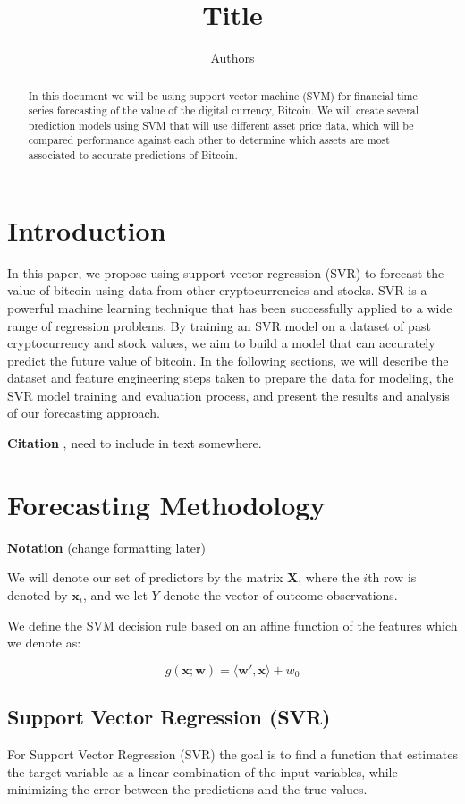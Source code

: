 \documentclass[11pt]{article}
\title{\vspace{-2cm}Title}
\author{Authors}
\date{\vspace{-5ex}}
\theoremstyle{definition}
\newcommand{\bx}{\mathbf{x}}
\newcommand{\bw}{\mathbf{w}}
\newcommand{\bX}{\mathbf{X}}
\begin{document}
 
\maketitle

\begin{abstract}
In this document we will be using support vector machine (SVM) for financial time series forecasting of the value of the digital currency, Bitcoin. We will create several prediction models using SVM that will use different asset price data, which will be compared performance against each other to determine which assets are most associated to accurate predictions of Bitcoin.


\end{abstract}

\section{Introduction}
In this paper, we propose using support vector regression (SVR) to forecast the value of bitcoin using data from other cryptocurrencies and stocks. SVR is a powerful machine learning technique that has been successfully applied to a wide range of regression problems. By training an SVR model on a dataset of past cryptocurrency and stock values, we aim to build a model that can accurately predict the future value of bitcoin. In the following sections, we will describe the dataset and feature engineering steps taken to prepare the data for modeling, the SVR model training and evaluation process, and present the results and analysis of our forecasting approach.

\textbf{Citation} \citet{trafalisSVM}, need to include in text somewhere.


\section{Forecasting Methodology}
\textbf{Notation} (change formatting later)

We will denote our set of predictors by the matrix $\bX$, where the $i$th row is denoted by $\bx_i$, and we let $Y$ denote the vector of outcome observations. 

We define the SVM decision rule based on an affine function of the features which we denote as:

$$g(\bx;\bw) = \langle \bw',\bx \rangle + w_0$$

\subsection{Support Vector Regression (SVR)}
For Support Vector Regression (SVR) the goal is to find a function that estimates the target variable as a linear combination of the input variables, while minimizing the error between the predictions and the true values.
\end{document}
